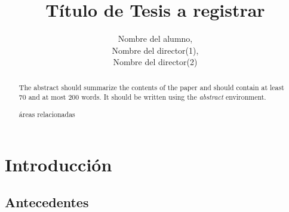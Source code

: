 \documentclass[runningheads,a4paper]{book}
\newcommand{\keywords}[1]{\par\addvspace\baselineskip
\noindent\keywordname\enspace\ignorespaces#1}
\begin{document}
\mainmatter  %

\title{Título de Tesis a registrar}

\titlerunning{ }

%
%
\author{Nombre del alumno,\\
Nombre del director(1),\\
Nombre del director(2)}
%
\authorrunning{ }


%
%

\maketitle


\begin{abstract}
The abstract should summarize the contents of the paper and should
contain at least 70 and at most 200 words. It should be written using the
\emph{abstract} environment.
\keywords{\'areas relacionadas}
\end{abstract}


\section{Introducción}
\subsection{Antecedentes}
\end{document}
